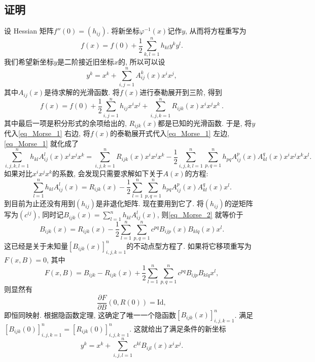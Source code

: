 \subsection{证明}
设 Hessian 矩阵$f''(0)=(h_{ij})$. 将新坐标$\varphi^{-1}(x)$记作$y$, 从而将方程重写为
\begin{equation}\label{eq_Morse_1}
f(x)=f(0)+\frac{1}{2}\sum_{k,l=1}^nh_{kl}y^ky^l.
\end{equation}
我们希望新坐标$y$是二阶接近旧坐标$x$的, 所以可以设
$$
y^k
=x^k+\sum_{i,j=1}^nA^k_{ij}(x)x^ix^j,
$$
其中$A_{ij}(x)$是待求解的光滑函数. 将$f(x)$进行泰勒展开到三阶, 得到
$$
f(x)=f(0)+\frac{1}{2}\sum_{i,j=1}^nh_{ij}x^ix^j+
\sum_{i,j,k=1}^nR_{ijk}(x)x^ix^jx^k~.
$$
其中最后一项是积分形式的余项给出的, $R_{ijk}(x)$都是已知的光滑函数. 于是, 将$y$代入\autoref{eq_Morse_1} 右边, 将$f(x)$的泰勒展开式代入\autoref{eq_Morse_1} 左边, \autoref{eq_Morse_1} 就化成了
$$
\sum_{i,j,k,l=1}^nh_{kl}A^l_{ij}(x)x^ix^jx^k
=\sum_{i,j,k=1}^nR_{ijk}(x)x^ix^jx^k
-\frac{1}{2}\sum_{i,j,k,l=1}^n\sum_{p,q=1}^nh_{pq}A^p_{ij}(x)A^q_{kl}(x)x^ix^jx^kx^l.
$$
如果对比$x^ix^jx^k$的系数, 会发现只需要求解如下关于$A(x)$的方程:
\begin{equation}\label{eq_Morse_2}
\sum_{l=1}^nh_{kl}A^l_{ij}(x)
=R_{ijk}(x)
-\frac{1}{2}\sum_{l=1}^n\sum_{p,q=1}^nh_{pq}A^p_{ij}(x)A^q_{kl}(x)x^l.
\end{equation}
到目前为止还没有用到$(h_{ij})$是非退化矩阵. 现在要用到它了. 将$(h_{ij})$的逆矩阵写为$(c^{ij})$, 同时记$B_{ijk}(x)=\sum_{l=1}^nh_{kl}A^l_{ij}(x)$, 则\autoref{eq_Morse_2} 就等价于
$$
B_{ijk}(x)
=R_{ijk}(x)-\frac{1}{2}\sum_{l=1}^n\sum_{p,q=1}^nc^{pq}B_{ijp}(x)B_{klq}(x)x^l.
$$
这已经是关于未知量$[B_{ijk}(x)]_{i,j,k=1}^n$的不动点型方程了. 如果将它移项重写为$F(x,B)=0$, 其中
$$
F(x,B)=B_{ijk}-R_{ijk}(x)+\frac{1}{2}\sum_{l=1}^n\sum_{p,q=1}^nc^{pq}B_{ijp}B_{klq}x^l,
$$
则显然有
$$
\frac{\partial F}{\partial B}(0,R(0))=\mathrm{Id},
$$
即恒同映射. 根据隐函数定理, 这确定了唯一一个隐函数$[B_{ijk}(x)]_{i,j,k=1}^n$. 满足$[B_{ijk}(0)]_{i,j,k=1}^n=[R_{ijk}(0)]_{i,j,k=1}^n$. 这就给出了满足条件的新坐标
$$
y^k
=x^k+\sum_{i,j,l=1}^nc^{kl}B_{ijl}(x)x^ix^j.
$$ 
